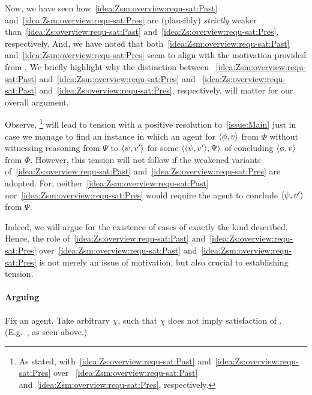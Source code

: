 \begin{note}
  Now, we have seen how~\ref{idea:Zsm:overview:requ-sat:Past} and~\ref{idea:Zsm:overview:requ-sat:Pres} are (plausibly) \emph{strictly} weaker than~\ref{idea:Zs:overview:requ-sat:Past} and~\ref{idea:Zs:overview:requ-sat:Pres}, respectively.
  And, we have noted that both~\ref{idea:Zsm:overview:requ-sat:Past} and~\ref{idea:Zsm:overview:requ-sat:Pres} seem to align with the motivation provided from \csN{}.
  We briefly highlight why the distinction between ~\ref{idea:Zsm:overview:requ-sat:Past} and~\ref{idea:Zsm:overview:requ-sat:Pres} and ~\ref{idea:Zs:overview:requ-sat:Past} and~\ref{idea:Zs:overview:requ-sat:Pres}, respectively, will matter for our overall argument.

  Observe, \csN{}%
  \footnote{
    As stated, with~\ref{idea:Zs:overview:requ-sat:Past} and~\ref{idea:Zs:overview:requ-sat:Pres} over ~\ref{idea:Zsm:overview:requ-sat:Past} and~\ref{idea:Zsm:overview:requ-sat:Pres}, respectively.
  }
  will lead to tension with a positive resolution to~\autoref{issue:Main} just in case we manage to find an instance in which an agent \csN{} for \(\langle \phi, v \rangle\) from \(\Phi\) without witnessing reasoning from \(\Psi\) to \(\langle \psi, v' \rangle\) for some \requ{} \(\langle \langle \psi, v' \rangle, \Psi \rangle\) of concluding \(\langle \phi, v \rangle\) from \(\Phi\).
  However, this tension will not follow if the weakened variants of~\ref{idea:Zs:overview:requ-sat:Past} and~\ref{idea:Zs:overview:requ-sat:Pres} are adopted.
  For, neither~\ref{idea:Zsm:overview:requ-sat:Past} nor~\ref{idea:Zsm:overview:requ-sat:Pres} would require the agent to conclude \(\langle \psi, v' \rangle\) from \(\Psi\).

  Indeed, we will argue for the existence of cases of exactly the kind described.
  Hence, the role of~\ref{idea:Zs:overview:requ-sat:Past} and~\ref{idea:Zs:overview:requ-sat:Pres} over~\ref{idea:Zsm:overview:requ-sat:Past} and~\ref{idea:Zsm:overview:requ-sat:Pres} is not merely an issue of motivation, but also crucial to establishing tension.
\end{note}

\paragraph*{Arguing}

\begin{note}
  Fix an agent.
  Take arbitrary \(\chi\), such that \(\chi\) does not imply satisfaction of \iZS{}.
  (E.g.\ \iZSm{}, as seen above.)
\end{note}

